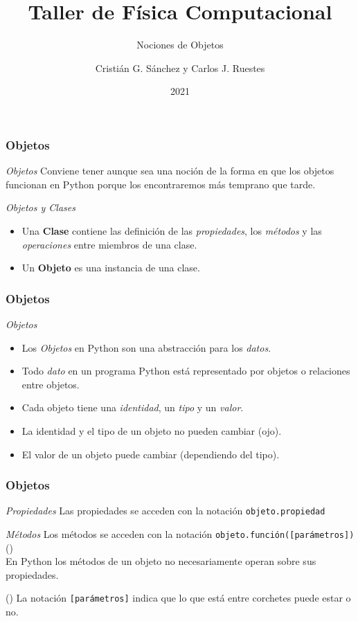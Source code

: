 \documentclass{beamer}
\title{Taller de Física Computacional}
\subtitle{Nociones de Objetos}
\author{Cristián G. Sánchez y Carlos J. Ruestes}
\date{2021}
\begin{document}
\frame{\titlepage}

\begin{frame}[fragile]
\frametitle{Objetos}
\begin{block}{{\em Objetos}}
Conviene tener aunque sea una noción de la forma en que los objetos funcionan en Python porque los encontraremos más temprano que tarde.
\end{block}
\begin{block}{{\em Objetos y Clases}}
\begin{itemize}
\item Una {\bf Clase} contiene las definición de las {\em propiedades}, los {\em métodos} y las {\em operaciones} entre miembros de una clase.
\item Un {\bf Objeto} es una instancia de una clase.
\end{itemize}
\end{block}
\end{frame}

\begin{frame}[fragile]
\frametitle{Objetos}
\begin{block}{{\em Objetos}}
\begin{itemize}
\item Los {\em Objetos} en Python son una abstracción para los {\em datos}. 
\item Todo {\em dato} en un programa Python está representado por objetos o relaciones entre objetos.
\item Cada objeto tiene una {\em identidad}, un {\em tipo} y un {\em valor}.
\item La identidad y el tipo de un objeto no pueden cambiar (ojo).
\item El valor de un objeto puede cambiar (dependiendo del tipo).
\end{itemize}
\end{block}
\end{frame}

\begin{frame}[fragile]
\frametitle{Objetos}

\begin{block}{{\em Propiedades}}
Las propiedades se acceden con la notación  \texttt{objeto.propiedad}
\end{block}
\begin{block}{{\em Métodos}}
Los métodos se acceden con la notación  \texttt{objeto.función([parámetros])} (\dag)\\
En Python los métodos de un objeto no necesariamente operan sobre sus propiedades.
\end{block} 
(\dag) La notación \texttt{[parámetros]} indica que lo que está entre corchetes puede estar o no. 
\end{frame}
\end{document}
